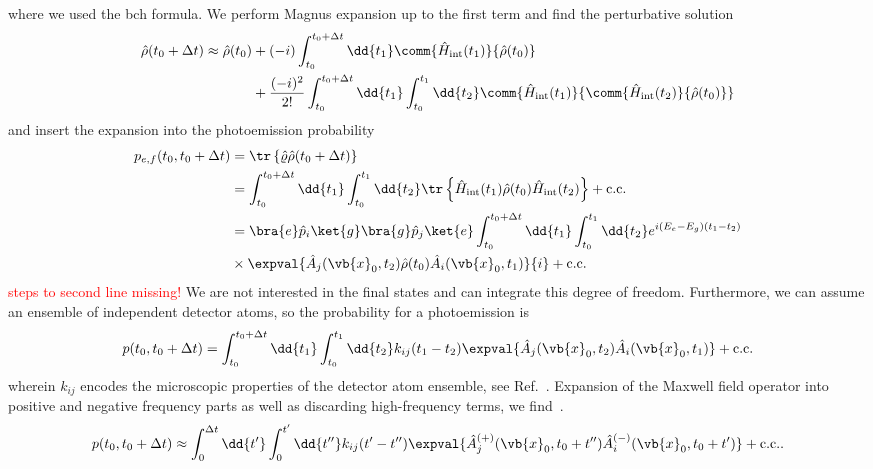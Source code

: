 where we used the \gls{bch} formula.
We perform Magnus expansion up to the first term and find the perturbative solution
\begin{equation}
	\begin{split}
		\hat\rho(t_0+\Delta t)
		\approx
		\hat\rho(t_0)
		&+
		(-i)
		\int_{t_0}^{t_0+\Delta t}\dd{t_1}
		\comm{\hat{H}_\text{int}(t_1)}{\hat\rho(t_0)}
		\\
		&+
		\frac{(-i)^2}{2!}
		\int_{t_0}^{t_0+\Delta t}\dd{t_1}
		\int_{t_0}^{t_1}\dd{t_2}
		\comm{\hat{H}_\text{int}(t_1)}{\comm{\hat{H}_\text{int}(t_2)}{\hat\rho(t_0)}}
	\end{split}	
\end{equation}
and insert the expansion into the photoemission probability
\begin{equation}
	\begin{split}
		p_{e,f}(t_0,t_0+\Delta t)
		&=
		\tr\left\{
			\hat\varrho
			\hat\rho(t_0+\Delta t)
		\right\}
		\\
		&=
		\int_{t_0}^{t_0+\Delta t}\dd{t_1}
		\int_{t_0}^{t_1}\dd{t_2}
		\tr\left\{
			\hat{H}_\text{int}(t_1)
			\hat\rho(t_0)
			\hat{H}_\text{int}(t_2)
		\right\}
		+
		\text{c.c.}
		\\
		&=
		\bra{e}\hat{p}_i\ket{g}
		\bra{g}\hat{p}_j\ket{e}
		\int_{t_0}^{t_0+\Delta t}\dd{t_1}
		\int_{t_0}^{t_1}\dd{t_2}
		e^{i(E_e-E_g)(t_1-t_2)}
		\\
		&\times
		\expval{
			\hat{A}_j(\vb{x}_0,t_2)
			\hat\rho(t_0)
			\hat{A}_i(\vb{x}_0,t_1)
		}{i}
		+
		\text{c.c.}
	\end{split}
\end{equation}
\textcolor{red}{steps to second line missing!}
We are not interested in the final states and can integrate this degree of freedom.
Furthermore, we can assume an ensemble of independent detector atoms, so the probability for a photoemission is
\begin{equation}
	p(t_0,t_0+\Delta t)
	=
	\int_{t_0}^{t_0+\Delta t}\dd{t_1}
	\int_{t_0}^{t_1}\dd{t_2}
	k_{ij}(t_1-t_2)
	\expval{
		\hat{A}_j(\vb{x}_0,t_2)
		\hat{A}_i(\vb{x}_0,t_1)
	}
	+
	\text{c.c.}
\end{equation}
wherein $k_{ij}$ encodes the microscopic properties of the detector atom ensemble, see Ref.~\cite[p.~694]{Mandel1995}.
Expansion of the Maxwell field operator into positive and negative frequency parts as well as discarding high-frequency terms, we find~\cite[p.~698]{Mandel1995}.
\begin{equation}
	p(t_0,t_0+\Delta t)
	\approx
	\int_0^{\Delta t}\dd{t^\prime}
	\int_0^{t^\prime}\dd{t^{\prime\prime}}
	k_{ij}(t^{\prime}-t^{\prime\prime})
	\expval{
		\hat{A}_j^{(+)}(\vb{x}_0,t_0+t^{\prime\prime})
		\hat{A}_i^{(-)}(\vb{x}_0,t_0+t^{\prime})
	}
	+
	\text{c.c.}
	.
\end{equation}
